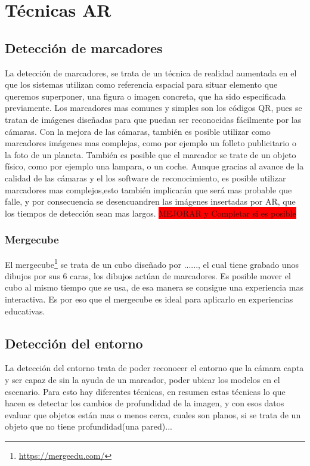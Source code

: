 \section{Técnicas AR}
	\subsection{Detección de marcadores}
	La detección de marcadores, se trata de un técnica de realidad aumentada en el que los sistemas utilizan como referencia espacial para situar elemento que queremos superponer, una figura o imagen concreta, que ha sido especificada previamente. Los marcadores mas comunes y simples son los códigos QR, pues se tratan de imágenes diseñadas para que puedan ser reconocidas fácilmente por las cámaras.
	Con la mejora de las cámaras, también es posible utilizar como marcadores imágenes mas complejas, como por ejemplo un folleto publicitario o la foto de un planeta.
	También es posible que el marcador se trate de un objeto físico, como por ejemplo una lampara, o un coche.
	Aunque gracias al avance de la calidad de las cámaras y el los software de reconocimiento, es posible utilizar marcadores mas complejos,esto también implicarán que será mas probable que falle, y por consecuencia se desencuandren las imágenes insertadas por AR, que los tiempos de detección sean mas largos.
	\colorbox{red}{MEJORAR y Completar si es posible}
	
	\subsubsection{Mergecube}
	El mergecube\footnote{\url{https://mergeedu.com/}} se trata de un cubo diseñado por ......, el cual tiene grabado unos dibujos por sus 6 caras, los dibujos actúan de marcadores. Es posible mover el cubo al mismo tiempo que se usa, de esa manera se consigue una experiencia mas interactiva. Es por eso que el mergecube es ideal para aplicarlo en experiencias educativas.
	\subsection{Detección del entorno}
	La detección del entorno trata de poder reconocer el entorno que la cámara capta y ser capaz de sin la ayuda de un marcador, poder ubicar los modelos en el escenario.
	Para esto hay diferentes técnicas, en resumen estas técnicas lo que hacen es detectar los cambios de profundidad de la imagen, y con esos datos evaluar que objetos están mas o menos cerca, cuales son planos, si se trata de un objeto que no tiene profundidad(una pared)...
